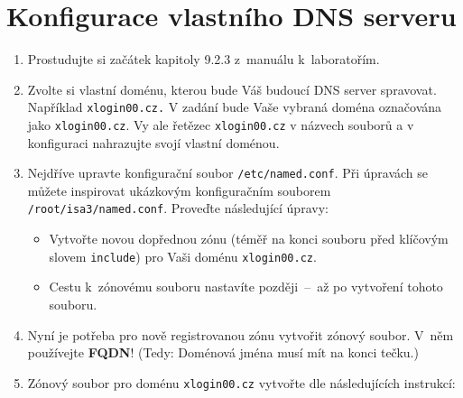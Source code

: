 \section{Konfigurace vlastního DNS serveru}
\begin{enumerate}
  \item Prostudujte si začátek kapitoly 9.2.3 z~manuálu k~laboratořím.
  \item Zvolte si vlastní doménu, kterou bude Váš budoucí DNS server spravovat. Například {\tt xlogin00.cz.} V zadání bude Vaše vybraná doména označována jako {\tt xlogin00.cz}. Vy ale řetězec {\tt xlogin00.cz} v názvech souborů a v konfiguraci nahrazujte svojí vlastní doménou.
  \item Nejdříve upravte konfigurační soubor {\tt /etc/named.conf}. Při úpravách se můžete inspirovat ukázkovým konfiguračním souborem {\tt /root/isa3/named.conf}. Proveďte následující úpravy:
    \begin{itemize}
      \item Vytvořte novou dopřednou zónu (téměř na konci souboru před klíčovým slovem {\tt include}) pro Vaši doménu {\tt xlogin00.cz}.
            \item Cestu k~zónovému souboru nastavíte později~--~až po vytvoření tohoto souboru.
    \end{itemize}
  
  \item Nyní je potřeba pro nově registrovanou zónu vytvořit zónový soubor. V~něm používejte \textbf{FQDN}! (Tedy: Doménová jména musí mít na konci tečku.)
  \item Zónový soubor pro doménu {\tt xlogin00.cz} vytvořte dle následujících instrukcí:
  

\end{enumerate}
